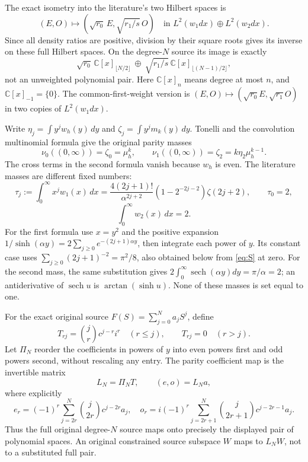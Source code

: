 \documentclass[11pt]{article}
\newcommand{\Pol}{\mathbb C[x]}
\begin{document}
The exact isometry into the literature's two Hilbert spaces is
\begin{equation}\label{eq:literature-isometry}
 (E,O)\longmapsto
       \left(\sqrt{r_0}\,E,\sqrt{r_1/s}\,O\right)
 \quad\text{in }L^2(w_1dx)\oplus L^2(w_2dx).
\end{equation}
Since all density ratios are positive, division by their square
roots gives its inverse on these full Hilbert spaces. On the
degree-$N$ source its image is exactly
\[
 \sqrt{r_0}\,\Pol_{\lfloor N/2\rfloor}
       \ \oplus\ \sqrt{r_1/s}\,\Pol_{\lfloor(N-1)/2\rfloor},
\]
not an unweighted polynomial pair. Here $\Pol_n$ means degree at
most $n$, and $\Pol_{-1}=\{0\}$. The common-first-weight version
is $(E,O)\mapsto(\sqrt{r_0}E,\sqrt{r_1}O)$ in two copies of
$L^2(w_1dx)$.

Write $\eta_j=\int y^jw_h(y)\,dy$ and
$\zeta_j=\int y^jm_k(y)\,dy$. Tonelli and the convolution
multinomial formula give the original parity masses
\begin{equation}\label{eq:masses}
 \nu_0((0,\infty))=\zeta_0=\mu_h^k,
 \qquad \nu_1((0,\infty))=\zeta_2=k\eta_2\mu_h^{k-1}.
\end{equation}
The cross terms in the second formula vanish because $w_h$ is
even. The literature masses are different fixed numbers:
\begin{equation}\label{eq:raw-moments}
 \tau_j:=\int_0^\infty x^j w_1(x)\,dx
 =\frac{4(2j+1)!}{\alpha^{2j+2}}
        (1-2^{-2j-2})\zeta(2j+2),\qquad \tau_0=2,
\end{equation}
\[
 \int_0^\infty w_2(x)\,dx=2.
\]
For the first formula use $x=y^2$ and the positive expansion
$1/\sinh(\alpha y)=2\sum_{j\geq0}e^{-(2j+1)\alpha y}$,
then integrate each power of $y$. Its constant case uses
$\sum_{j\geq0}(2j+1)^{-2}=\pi^2/8$, also obtained below from
\eqref{eq:S} at zero. For the second mass, the same substitution
gives $2\int_0^\infty\operatorname{sech}(\alpha y)dy=\pi/\alpha=2$;
an antiderivative of $\operatorname{sech} u$ is
$\arctan(\sinh u)$. None of these masses is set equal to one.

For the exact original source $F(S)=\sum_{j=0}^Na_jS^j$, define
\[
 T_{rj}=\binom jr c^{j-r}i^r\quad(r\leq j),\qquad T_{rj}=0\quad(r>j).
\]
Let $\Pi_N$ reorder the coefficients in powers of $y$ into even
powers first and odd powers second, without rescaling any entry.
The parity coefficient map is the invertible matrix
\begin{equation}\label{eq:source-map}
 L_N=\Pi_NT,\qquad (e,o)=L_Na,
\end{equation}
where explicitly
\[
 e_r=(-1)^r\sum_{j=2r}^N\binom j{2r}c^{j-2r}a_j,
 \quad
 o_r=i(-1)^r\sum_{j=2r+1}^N\binom j{2r+1}c^{j-2r-1}a_j.
\]
Thus the full original degree-$N$ source maps onto precisely the
displayed pair of polynomial spaces. An original constrained
source subspace $W$ maps to $L_NW$, not to a substituted full pair.
\end{document}
